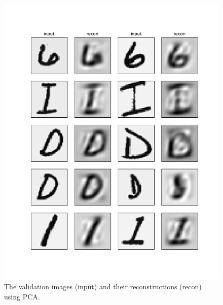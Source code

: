\documentclass[11pt]{article}
\begin{document}
\begin{figure}[h!]
    \centering
    \includegraphics[width=.8\linewidth]{../results/q6_2.png}
    \caption{The validation images (input) and their reconstructions (recon) using PCA. }
    \label{fig:q6.2}
\end{figure}
\end{document}
